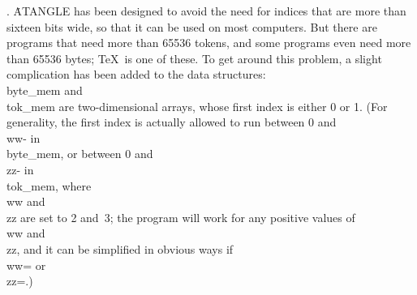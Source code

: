 . \.{ATANGLE} has been designed to avoid the need for indices that are more
than sixteen bits wide, so that it can be used on most computers. But
there are programs that need more than 65536 tokens, and some programs
even need more than 65536 bytes; \TeX\ is one of these.  To get around
this problem, a slight complication has been added to the data structures:
\\{byte\_mem} and \\{tok\_mem} are two-dimensional arrays, whose first index is
either 0 or 1. (For generality, the first index is actually allowed to run
between 0 and \\{ww}\?- in \\{byte\_mem}, or between 0 and \\{zz}\?- in %
\\{tok\_mem},
where \\{ww} and \\{zz} are set to 2 and~3; the program will work for any
positive values of \\{ww} and \\{zz}, and it can be simplified in obvious ways
if \\{ww}\?= or \\{zz}\?=.)

